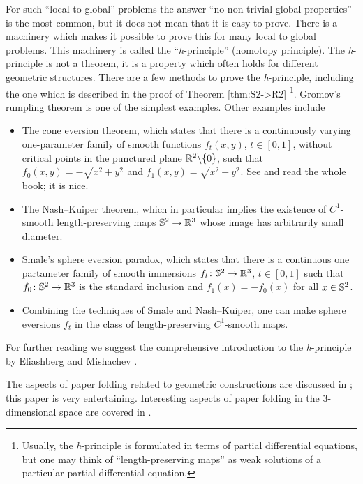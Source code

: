 For such ``local to global'' problems the answer
``no non-trivial global properties''
 is the most common, 
but
it does not mean that it is easy to prove.
There is a machinery which makes it possible to prove this for many local to global problems.
This machinery is called the ``\textit{h}-principle'' (homotopy principle).
The \textit{h}-principle is not a theorem, it is a property which often holds for different geometric structures.
There are a few methods to prove the
\textit{h}-principle, including the one which is described in the proof of Theorem \ref{thm:S2->R2}%
\footnote{Usually, the \textit{h}-principle is formulated in terms of partial differential equations, 
but one may think of ``length-preserving maps'' as weak solutions of a particular partial differential equation.}.
Gromov's rumpling theorem is one of the simplest examples.
Other examples include 
\begin{itemize}
\item The cone eversion theorem, which states that there is a continuously varying one-parameter family of smooth functions $f_t(x,y)$, $t\in[0,1]$, without critical points in
the punctured plane $\mathbb{R}^2\backslash\{0\}$, 
such that
$f_0(x,y)=-\sqrt{x^2+y^2}$ and $f_{1}(x,y)=\sqrt{x^2+y^2}$.
See \cite[Lecture 27]{TF} and read the whole book; it is nice.
\item The Nash--Kuiper theorem, which in particular implies the existence of $C^1$-smooth length-preserving maps $\mathbb{S}^2\to\mathbb{R}^3$ whose image has arbitrarily small diameter.
\item Smale's sphere eversion paradox, which states that there is a continuous one partameter family of smooth immersions $f_t\:\SS^2\z\to \RR^3$, $t\in[0,1]$ such that $f_0\:\SS^2\z\to \RR^3$ is the standard inclusion and $f_1(x)=-f_0(x)$ for all $x\in \mathbb{S}^2$.
\item Combining the techniques of Smale and Nash--Kuiper, 
one can make sphere eversions $f_t$ in the class of length-preserving $C^1$-smooth maps. 
\end{itemize}
 
For further reading we suggest the comprehensive introduction to the \textit{h}-principle 
by Eliashberg and Mishachev \cite{eliashberg-mishachev}.

 The aspects of paper folding related to geometric constructions are discussed in \cite{hull};
this paper is very entertaining.
Interesting aspects of paper folding in the 3-dimensional space are covered in \cite[Lecture 15]{TF}.




